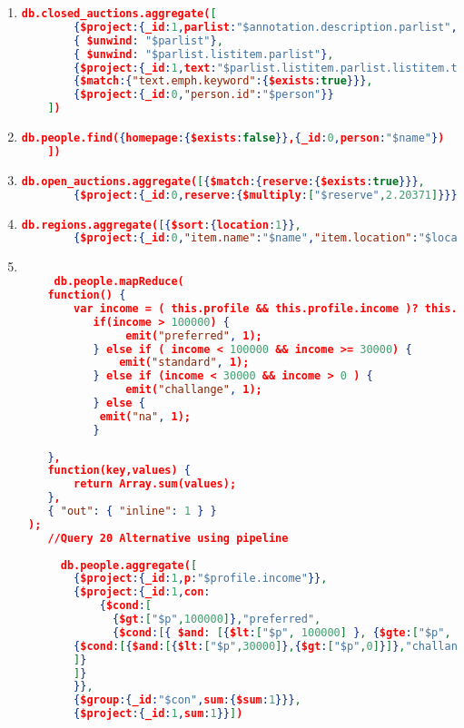 \begin{enumerate}[label=Q\arabic*.]
    \item %
	\begin{lstlisting}[language=JSON,   basicstyle=\scriptsize]
	  db.closed_auctions.aggregate([
		{$project:{_id:1,parlist:"$annotation.description.parlist",person:"$seller.person"}},
		{ $unwind: "$parlist"},
		{ $unwind: "$parlist.listitem.parlist"},
		{$project:{_id:1,text:"$parlist.listitem.parlist.listitem.text",person:1}},
		{$match:{"text.emph.keyword":{$exists:true}}},
		{$project:{_id:0,"person.id":"$person"}}
	])
	\end{lstlisting}	

    \item %
	\begin{lstlisting}[language=JSON,   basicstyle=\scriptsize]
	  db.people.find({homepage:{$exists:false}},{_id:0,person:"$name"})
	])
	\end{lstlisting}	

    \item %
	\begin{lstlisting}[language=JSON,   basicstyle=\scriptsize]
	  db.open_auctions.aggregate([{$match:{reserve:{$exists:true}}},
		{$project:{_id:0,reserve:{$multiply:["$reserve",2.20371]}}}])
	\end{lstlisting}	

    \item %
	\begin{lstlisting}[language=JSON,   basicstyle=\scriptsize]
	  db.regions.aggregate([{$sort:{location:1}},
		{$project:{_id:0,"item.name":"$name","item.location":"$location"}}])
	\end{lstlisting}	
    
    \item %
	\begin{lstlisting}[language=JSON,   basicstyle=\scriptsize]
	
	 db.people.mapReduce(
    function() {
        var income = ( this.profile && this.profile.income )? this.profile.income : 0;
           if(income > 100000) {
                emit("preferred", 1);   
           } else if ( income < 100000 && income >= 30000) {
               emit("standard", 1);
           } else if (income < 30000 && income > 0 ) {
                emit("challange", 1);
           } else {
            emit("na", 1);
           }
       
    },
    function(key,values) {
        return Array.sum(values);
    },
    { "out": { "inline": 1 } }
 );
 	//Query 20 Alternative using pipeline
	
	  db.people.aggregate([
		{$project:{_id:1,p:"$profile.income"}},
		{$project:{_id:1,con:
			{$cond:[
			  {$gt:["$p",100000]},"preferred",
			  {$cond:[{ $and: [{$lt:["$p", 100000] }, {$gte:["$p", 30000] }] },"standard",
		{$cond:[{$and:[{$lt:["$p",30000]},{$gt:["$p",0]}]},"challange","na"]}
		]}
		]}
		}},
		{$group:{_id:"$con",sum:{$sum:1}}},
		{$project:{_id:1,sum:1}}])
		

    
	\end{lstlisting}
\end{enumerate}
